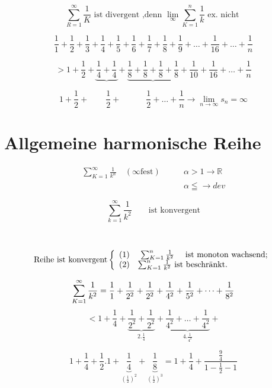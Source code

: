 

\begin{example}
	\[\sum_{R=1}^{\infty} \frac{1}{K} \text{ ist divergent ,denn  } \lim\limits_{\infty} \sum_{K=1}^{n} \frac{1}{k} \text{ ex. nicht } \]
	
	\[\frac{1}{1}+\frac{1}{2}+\frac{1}{3}+\frac{1}{4}+\frac{1}{5}+\frac{1}{6}+\frac{1}{7}+\frac{1}{8}+\frac{1}{9}+\dots+\frac{1}{16}+\dots+\frac{1}{n}\]
	
	\[ > 1+\frac{1}{2}+  \underbrace{\frac{1}{4}+\frac{1}{4}}+\underbrace{\frac{1}{8}+\frac{1}{8}+\frac{1}{8}+\frac{1}{8}}+\frac{1}{10}+\frac{1}{16}+\dots+\frac{1}{n}\] 
	
	\[1+\frac{1}{2} + \qquad \frac{1}{2}+   \quad  \qquad \frac{1}{2}  + \dots + \frac{1}{n}  \rightarrow \lim\limits_{n\rightarrow \infty }s_n = \infty \]
	
\end{example}
\section{Allgemeine harmonische Reihe}

				\begin{equation*}
				\begin{split}
				 \sum_{K=1}^{\infty} \frac{1}{k^\alpha} \quad( \infty \text{fest}) \qquad
				& \alpha > 1 \rightarrow \mathbb{R}  \\
				& \alpha \leqq \rightarrow dev
				\end{split}
				\end{equation*}
 \begin{example}
 	\[ \sum_{k=1}^{\infty} \frac{1}{k^2} \qquad \text{ist konvergent}
 	\] \\  \\
		\[ \text{Reihe ist konvergent} \left\{ \begin{array}{ll}
	   (1) & \mbox{ $\sum_{K=1}^{n} \frac{1}{k^2} $ \quad ist monoton wachsend};\\
	   (2) & \mbox{$\sum_{K=1}^{n} \frac{1}{k^2} $ \text{ist beschränkt}}.\end{array} \right. \] 
	   	
	   \[ \sum_{K=1}^{\infty} \frac{1}{k^2} = \frac{1}{1}+\frac{1}{2^2}+\frac{1}{2^2}+\frac{1}{4^2}+\frac{1}{5^2}+  \dots + \frac{1}{8^2}  \]
	   \[ <  1 + \frac{1}{4}+\underbrace{\frac{1}{2^2}+\frac{1}{2^2}}_{2. \frac{1}{4}}+\underbrace{\frac{1}{4^2}+\dots + \frac{1}{4^2}}_{4.\frac{1}{4^2}}+\]
	   
	   \[ 1+\frac{1}{4}+\frac{1}{2}.1+\underbrace{\frac{1}{4}}_{(\frac{1}{2})^2}+\underbrace{\frac{1}{8}}_{(\frac{1}{2})^3} =1+\frac{1}{4}+\frac{\frac{9}{4} }{1-\frac{1}{2}-1} \]
	   
 \end{example}
